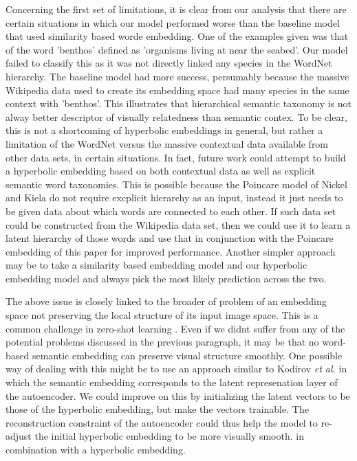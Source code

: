 \documentclass[12pt]{report}
\begin{document}
Concerning the first set of limitations, it is clear from our analysis that there are certain situations in which our model performed worse than the baseline model that used similarity based worde embedding. One of the examples given was that of the word 'benthos' defined as 'organisms living at near the seabed'. Our model failed to classify this as it was not directly linked any species in the WordNet hierarchy. The baseline model had more success, persumably because the massive Wikipedia data used to create its embedding space had many species in the same context with 'benthos'. This illustrates that hierarchical semantic taxonomy is not alway better descriptor of visually relatedness than semantic contex. To be clear, this is not a shortcoming of hyperbolic embeddings in general, but rather a limitation of the WordNet versus the massive contextual data available from other data sets, in certain situations. In fact, future work could attempt to build a hyperbolic embedding based on both contextual data as well as explicit semantic word taxonomies. This is possible because the Poincare model of Nickel and Kiela \cite{Nickel2018} do not require excplicit hierarchy as an input, instead it just needs to be given data about which words are connected to each other. If such data set could be constructed from the Wikipedia data set, then we could use it to learn a latent hierarchy of those words and use that in conjunction with the Poincare embedding of this paper for improved performance. Another simpler approach may be to take a similarity based embedding model and our hyperbolic embedding model and always pick the most likely prediction across the two. 

The above issue is closely linked to the broader of problem of an embedding space not preserving the local structure of its input image space. This is a common challenge in zero-shot learning \cite{Ji2017}. Even if we didnt suffer from any of the potential problems discussed in the previous paragraph, it may be that no word-based semantic embedding can preserve visual structure smoothly. One possible way of dealing with this might be to use an approach similar to Kodirov \textit{et al.} \cite{Kodirov2017} in which the semantic embedding corresponds to the latent represenation layer of the autoencoder. We could improve on this by initializing the latent vectors to be those of the hyperbolic embedding, but make the vectors trainable. The reconstruction constraint of the autoencoder could thus help the model to re-adjust the initial hyperbolic embedding to be more visually smooth.
in combination with a hyperbolic embedding. 
\end{document}
